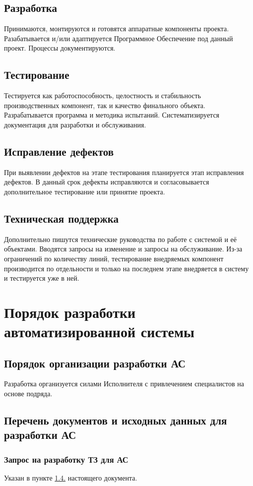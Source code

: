 \documentclass[16pt,a4paper]{article}
\begin{document}
\subsection{Разработка}
Принимаются, монтируются и готовятся аппаратные компоненты проекта. Разабатывается и/или адаптируется Программное Обеспечение под данный проект. Процессы документируются.
\subsection{Тестирование}
Тестируется как работоспособность, целостность и стабильность производственных компонент, так и качество финального объекта. Разрабатывается программа и методика испытаний. Систематизируется документация для разработки и обслуживания.
\subsection{Исправление дефектов}
При выявлении дефектов на этапе тестирования планируется этап исправления дефектов. В данный срок дефекты исправляются и согласовывается дополнительное тестирование или принятие проекта.
\subsection{Техническая поддержка}
Дополнительно пишутся технические руководства по работе с системой и её объектами. Вводятся запросы на изменение и запросы на обслуживание. Из-за ограничений по количеству линий, тестирование внедряемых компонент производится по отдельности и только на последнем этапе внедряется в систему и тестируется уже в ней.
\section{Порядок разработки автоматизированной системы}
\subsection{Порядок организации разработки АС}
Разработка организуется силами Исполнителя с привлечением специалистов на основе подряда.
\subsection{Перечень документов и исходных данных для разработки АС}
\subsubsection{Запрос на разработку ТЗ для АС}
Указан в пункте \hyperref[sec:1.4..]{1.4.} настоящего документа.
\end{document}
